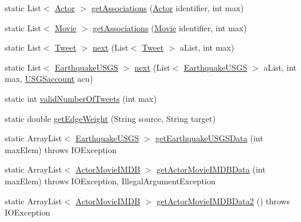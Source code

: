\begin{DoxyCompactItemize}
\item 
static List$<$ \hyperlink{classbridges_1_1data__src__dependent_1_1_actor}{Actor} $>$ \hyperlink{classbridges_1_1connect_1_1_data_formatter_a5e9f400a020b99e0bbba1fd5332a8f88}{get\+Associations} (\hyperlink{classbridges_1_1data__src__dependent_1_1_actor}{Actor} identifier, int max)
\item 
static List$<$ \hyperlink{classbridges_1_1data__src__dependent_1_1_movie}{Movie} $>$ \hyperlink{classbridges_1_1connect_1_1_data_formatter_ad0377b692c07836fb1016e5fb296e79c}{get\+Associations} (\hyperlink{classbridges_1_1data__src__dependent_1_1_movie}{Movie} identifier, int max)
\item 
static List$<$ \hyperlink{classbridges_1_1data__src__dependent_1_1_tweet}{Tweet} $>$ \hyperlink{classbridges_1_1connect_1_1_data_formatter_a3d0b2d2e0384d2a537bb61fbeb3d00a4}{next} (List$<$ \hyperlink{classbridges_1_1data__src__dependent_1_1_tweet}{Tweet} $>$ a\+List, int max)
\item 
static List$<$ \hyperlink{classbridges_1_1data__src__dependent_1_1_earthquake_u_s_g_s}{Earthquake\+U\+S\+G\+S} $>$ \hyperlink{classbridges_1_1connect_1_1_data_formatter_ad451dd96b927702127d383e85fc98661}{next} (List$<$ \hyperlink{classbridges_1_1data__src__dependent_1_1_earthquake_u_s_g_s}{Earthquake\+U\+S\+G\+S} $>$ a\+List, int max, \hyperlink{classbridges_1_1data__src__dependent_1_1_u_s_g_saccount}{U\+S\+G\+Saccount} acu)
\item 
static int \hyperlink{classbridges_1_1connect_1_1_data_formatter_ad17084ac8b0f28837ebb1d77905cefb8}{valid\+Number\+Of\+Tweets} (int max)
\item 
static double \hyperlink{classbridges_1_1connect_1_1_data_formatter_a2637c733e7f4efccfb56de0940506318}{get\+Edge\+Weight} (String source, String target)
\item 
static Array\+List$<$ \hyperlink{classbridges_1_1data__src__dependent_1_1_earthquake_u_s_g_s}{Earthquake\+U\+S\+G\+S} $>$ \hyperlink{classbridges_1_1connect_1_1_data_formatter_a31f1f3e398fbf7225c790dbbbde238dd}{get\+Earthquake\+U\+S\+G\+S\+Data} (int max\+Elem)  throws I\+O\+Exception 
\item 
static Array\+List$<$ \hyperlink{classbridges_1_1data__src__dependent_1_1_actor_movie_i_m_d_b}{Actor\+Movie\+I\+M\+D\+B} $>$ \hyperlink{classbridges_1_1connect_1_1_data_formatter_aa2a84fe044615b2e1b166d412babac0f}{get\+Actor\+Movie\+I\+M\+D\+B\+Data} (int max\+Elem)  throws I\+O\+Exception, Illegal\+Argument\+Exception 
\item 
static Array\+List$<$ \hyperlink{classbridges_1_1data__src__dependent_1_1_actor_movie_i_m_d_b}{Actor\+Movie\+I\+M\+D\+B} $>$ \hyperlink{classbridges_1_1connect_1_1_data_formatter_a9b599616c4d7a502f9fab8663173db6d}{get\+Actor\+Movie\+I\+M\+D\+B\+Data2} ()  throws I\+O\+Exception 

\end{DoxyCompactItemize}
